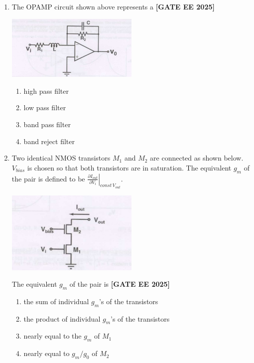 \documentclass[12pt,a4paper]{article}
\begin{document}
\begin{enumerate}[leftmargin=*, label=\textbf{Q.\arabic*:}]
\item The OPAMP circuit shown above represents a
\newline
\noindent \textbf{[GATE EE 2025]}
\begin{center}
\includegraphics[width=0.5\textwidth]{figs/q47.png}
\end{center}

\begin{enumerate}[label=(\Alph*)]
  \item high pass filter
  \item low pass filter
  \item band pass filter
  \item band reject filter
\end{enumerate}

\item Two identical NMOS transistors $M_1$ and $M_2$ are connected as shown below. $V_{bias}$ is chosen so that both transistors are in saturation. The equivalent $g_m$ of the pair is defined to be $\left. \frac{\partial I_{out}}{\partial V_i} \right|_{const\, V_{out}}$.

\begin{center}
\includegraphics[width=0.5\textwidth]{figs/q48.png}
\end{center}

The equivalent $g_m$ of the pair is
\newline
\noindent \textbf{[GATE EE 2025]}
\begin{enumerate}[label=(\Alph*)]
  \item the sum of individual $g_m$'s of the transistors
  \item the product of individual $g_m$'s of the transistors
  \item nearly equal to the $g_m$ of $M_1$
  \item nearly equal to $g_m/g_{0}$ of $M_2$
\end{enumerate}


\end{enumerate}
\end{document}
